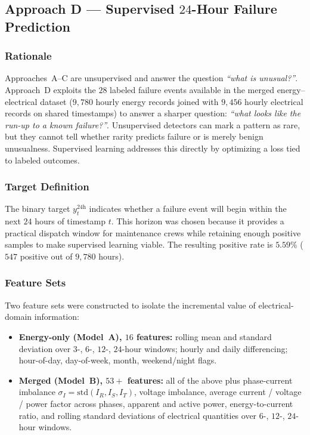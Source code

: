 \documentclass[11pt]{article}
\begin{document}
\subsection{Approach D --- Supervised $24$-Hour Failure Prediction}
\label{subsec:approachD}

\subsubsection*{Rationale}
Approaches~A--C are unsupervised and answer the question \emph{``what is unusual?''}. Approach~D exploits the $28$ labeled failure events available in the merged energy--electrical dataset ($9{,}780$ hourly energy records joined with $9{,}456$ hourly electrical records on shared timestamps) to answer a sharper question: \emph{``what looks like the run-up to a known failure?''}. Unsupervised detectors can mark a pattern as rare, but they cannot tell whether rarity predicts failure or is merely benign unusualness. Supervised learning addresses this directly by optimizing a loss tied to labeled outcomes.

\subsubsection*{Target Definition}
The binary target $y_t^{24\mathrm{h}}$ indicates whether a failure event will begin within the next $24$ hours of timestamp $t$. This horizon was chosen because it provides a practical dispatch window for maintenance crews while retaining enough positive samples to make supervised learning viable. The resulting positive rate is $5.59\%$ ($547$ positive out of $9{,}780$ hours).

\subsubsection*{Feature Sets}
Two feature sets were constructed to isolate the incremental value of electrical-domain information:

\begin{itemize}[leftmargin=1.5em,itemsep=1pt]
  \item \textbf{Energy-only (Model~A), $16$ features:} rolling mean and standard deviation over $3$-, $6$-, $12$-, $24$-hour windows; hourly and daily differencing; hour-of-day, day-of-week, month, weekend/night flags.
  \item \textbf{Merged (Model~B), $53+$ features:} all of the above plus phase-current imbalance $\sigma_I = \mathrm{std}(I_R, I_S, I_T)$, voltage imbalance, average current / voltage / power factor across phases, apparent and active power, energy-to-current ratio, and rolling standard deviations of electrical quantities over $6$-, $12$-, $24$-hour windows.
\end{itemize}
\end{document}
